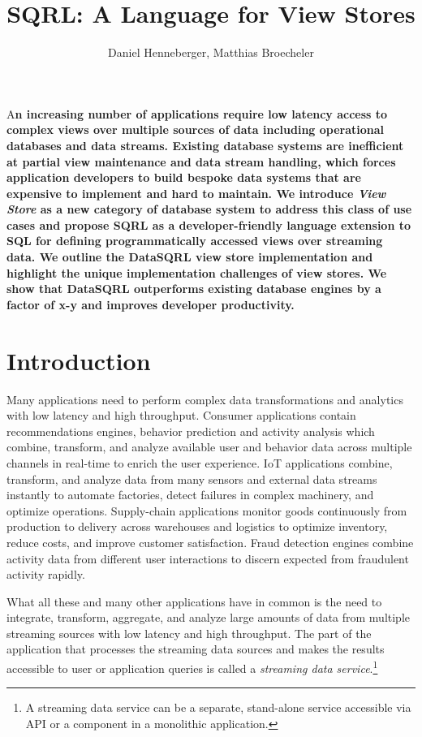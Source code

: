 \documentclass[	DIV=calc,%
							paper=letter,%
							fontsize=11pt,%
							twocolumn]{scrartcl}	 					%
\title{SQRL: A Language for View Stores}					%
\author{Daniel Henneberger, Matthias Broecheler }					%
\date{}																				%
\newcommand{\initial}[1]{%
     \lettrine[lines=3,lhang=0.3,nindent=0em]{
     				\color{sqrlPrimary}
     				{\textsf{#1}}}{}}
\begin{document}
\maketitle
\thispagestyle{fancy} 			%
\initial{A}\textbf{n increasing number of applications require low latency access to complex views over multiple sources of data including operational databases and data streams. Existing database systems are inefficient at partial view maintenance and data stream handling, which forces application developers to build bespoke data systems that are expensive to implement and hard to maintain.
We introduce \emph{View Store} as a new category of database system to address this class of use cases and propose SQRL as a developer-friendly language extension to SQL for defining programmatically accessed views over streaming data. We outline the DataSQRL view store implementation and highlight the unique implementation challenges of view stores. We show that DataSQRL outperforms existing database engines by a factor of x-y and improves developer productivity.}

\section{Introduction}

Many applications need to perform complex data transformations and analytics with low latency and high throughput. Consumer applications contain recommendations engines, behavior prediction and activity analysis which combine, transform, and analyze available user and behavior data across multiple channels in real-time to enrich the user experience. IoT applications combine, transform, and analyze data from many sensors and external data streams instantly to automate factories, detect failures in complex machinery, and optimize operations. Supply-chain applications monitor goods continuously from production to delivery across warehouses and logistics to optimize inventory, reduce costs, and improve customer satisfaction. Fraud detection engines combine activity data from different user interactions to discern expected from fraudulent activity rapidly.

What all these and many other applications have in common is the need to integrate, transform, aggregate, and analyze large amounts of data from multiple streaming sources with low latency and high throughput. The part of the application that processes the streaming data sources and makes the results accessible to user or application queries is called a \emph{streaming data service}.\footnote{A streaming data service can be a separate, stand-alone service accessible via API or a component in a monolithic application.}
\end{document}
